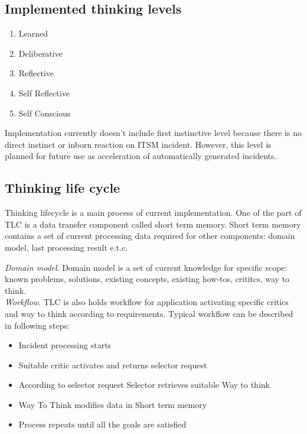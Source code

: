 \documentclass[12pt]{article}
\begin{document}
\subsection{Implemented thinking levels}

\begin{enumerate}
 \item Learned
 \item Deliberative
 \item Reflective
 \item Self Reflective
 \item Self Conscious
\end{enumerate}

Implementation currently doesn’t include first instinctive level because there is no direct instinct or inborn reaction on ITSM incident. However, this level is planned for future use as acceleration of automatically generated incidents.

\subsection{Thinking life cycle}

Thinking lifecycle is a main process of current implementation. One of the part of TLC is a data transfer component called short term memory. Short term memory contains a set of current processing data required for other components: domain model, last processing result e.t.c.

\emph{Domain model}. Domain model is a set of current knowledge for specific scope: known problems, solutions, existing concepts, existing how-tos, crititcs, way to think.\\

\emph{Workflow}. TLC is also holds workflow for application activating specific critics and way to think according to requirements. Typical workflow can be described in following steps:

\begin{itemize}
 \item Incident processing starts
 \item Suitable critic activates and returns selector request
 \item According to selector request Selector retrieves suitable Way to think
 \item Way To Think modifies data in Short term memory
 \item Process repeats until all the goals are satisfied
\end{itemize}
\end{document}
